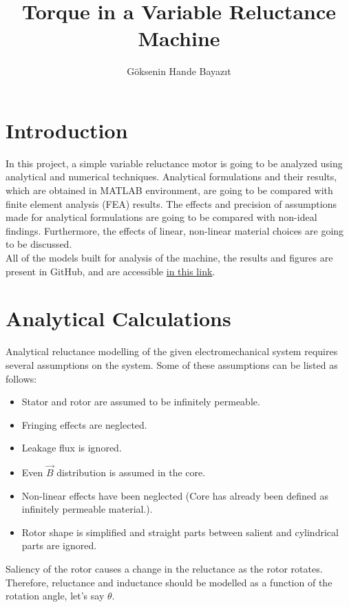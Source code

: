 \documentclass{reportClass}
\title{Torque in a Variable Reluctance Machine}
\author{G\"{o}ksenin Hande Bayazıt}
\begin{document}
\printtitle



\section{Introduction}

In this project, a simple variable reluctance motor is going to be analyzed using analytical and numerical techniques. Analytical formulations and their results, which are obtained in MATLAB environment, are going to be compared with finite element analysis (FEA) results. The effects and precision of assumptions made for analytical formulations are going to be compared with non-ideal findings. Furthermore, the effects of linear, non-linear material choices are going to be discussed.\\

All of the models built for analysis of the machine, the results and figures are present in GitHub, and are accessible \href{http://www.github.com/ghandeb/EE568/tree/master/Project_1}{in this link}.
 
 
\section{Analytical Calculations}

\par Analytical reluctance modelling of the given electromechanical system requires several assumptions on the system. Some of these assumptions can be listed as follows:

\begin{itemize}
\item Stator and rotor are assumed to be infinitely permeable.
\item Fringing effects are neglected.
\item Leakage flux is ignored.
\item Even $\vec{B}$ distribution is assumed in the core.
\item Non-linear effects have been neglected (Core has already been defined as infinitely permeable material.).
\item Rotor shape is simplified and straight parts between salient and cylindrical parts are ignored.

\end{itemize} 


Saliency of the rotor causes a change in the reluctance as the rotor rotates. Therefore, reluctance and inductance should be modelled as a function of the rotation angle, let's say $\theta$.\\
\end{document}
